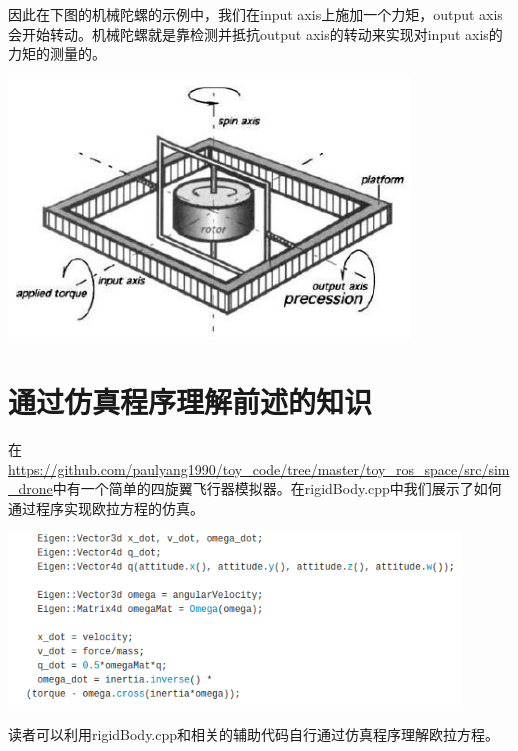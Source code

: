 \documentclass[11pt]{article}
\begin{document}
因此在下图的机械陀螺的示例中，我们在input axis上施加一个力矩，output axis会开始转动。机械陀螺就是靠检测并抵抗output axis的转动来实现对input axis的力矩的测量的。

\includegraphics[width=0.8\textwidth]{images/gyroscopeAxes.jpg}

\section{通过仿真程序理解前述的知识}

在\url{https://github.com/paulyang1990/toy_code/tree/master/toy_ros_space/src/sim_drone}中有一个简单的四旋翼飞行器模拟器。在rigidBody.cpp中我们展示了如何通过程序实现欧拉方程的仿真。

\begin{center}
\includegraphics[width=0.9\textwidth]{images/code.png}
\end{center}

读者可以利用rigidBody.cpp和相关的辅助代码自行通过仿真程序理解欧拉方程。


\end{document}
